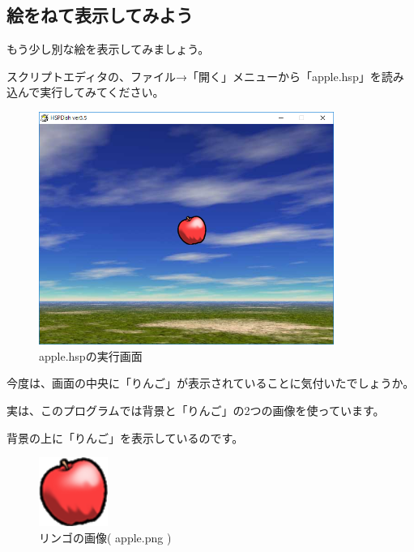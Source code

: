 \newpage
\subsection{絵をねて表示してみよう}


もう少し別な絵を表示してみましょう。

スクリプトエディタの、ファイル→「開く」メニューから「apple.hsp」を読み込んで実行してみてください。

\begin{figure}[H]
    \begin{center}
      \includegraphics[keepaspectratio,width=9.634cm,height=7.599cm]{text04-img/s_applehsp.png}
      \caption{apple.hspの実行画面}
    \end{center}
    \label{fig:prog_menu}
\end{figure}

今度は、画面の中央に「りんご」が表示されていることに気付いたでしょうか。


実は、このプログラムでは背景と「りんご」の2つの画像を使っています。

背景の上に「りんご」を表示しているのです。


\begin{figure}[H]
    \begin{center}
      \includegraphics[keepaspectratio,width=2.249cm,height=2.249cm]{text04-img/s_apple.png}
      \caption{リンゴの画像( apple.png )}
    \end{center}
    \label{fig:prog_menu}
\end{figure}


